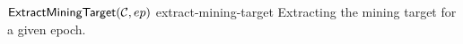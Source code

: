 \begin{cccAlgorithm}
    {$\mathsf{ExtractMiningTarget}(\mathcal{C}, ep)$}
    {extract-mining-target}
    {Extracting the mining target for a given epoch.}

    \begin{algorithmic}[1]
         

        \EndFor
    \end{algorithmic}
\end{cccAlgorithm}